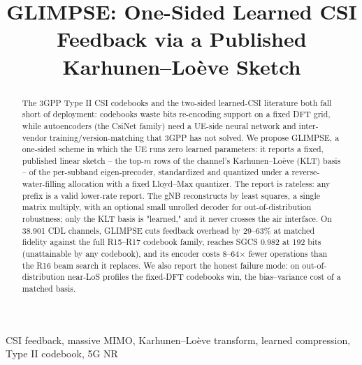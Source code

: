 \documentclass[conference]{IEEEtran}
\begin{document}
\title{GLIMPSE: One-Sided Learned CSI Feedback via a Published Karhunen--Lo\`{e}ve Sketch}

\author{
}

\maketitle

\begin{abstract}
The 3GPP Type II CSI codebooks and the two-sided learned-CSI literature both fall short of deployment: codebooks waste bits re-encoding support on a fixed DFT grid, while autoencoders (the CsiNet family) need a UE-side neural network and inter-vendor training/version-matching that 3GPP has not solved. We propose GLIMPSE, a one-sided scheme in which the UE runs zero learned parameters: it reports a fixed, published linear sketch -- the top-$m$ rows of the channel's Karhunen--Lo\`{e}ve (KLT) basis -- of the per-subband eigen-precoder, standardized and quantized under a reverse-water-filling allocation with a fixed Lloyd--Max quantizer. The report is rateless: any prefix is a valid lower-rate report. The gNB reconstructs by least squares, a single matrix multiply, with an optional small unrolled decoder for out-of-distribution robustness; only the KLT basis is "learned," and it never crosses the air interface. On 38.901 CDL channels, GLIMPSE cuts feedback overhead by 29--63\% at matched fidelity against the full R15--R17 codebook family, reaches SGCS 0.982 at 192 bits (unattainable by any codebook), and its encoder costs 8--64$\times$ fewer operations than the R16 beam search it replaces. We also report the honest failure mode: on out-of-distribution near-LoS profiles the fixed-DFT codebooks win, the bias--variance cost of a matched basis.
\end{abstract}

\begin{IEEEkeywords}
CSI feedback, massive MIMO, Karhunen--Lo\`{e}ve transform, learned compression, Type II codebook, 5G NR
\end{IEEEkeywords}
\end{document}
